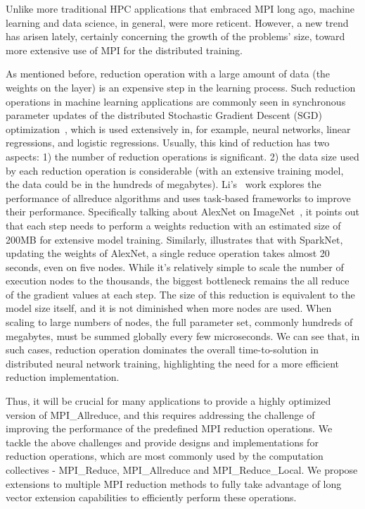 \documentclass[5p,times,twocolumn]{elsarticle}
\newcommand{\mpi}[0]{\textsc{MPI}\xspace}
\newcommand{\sve}[0]{\textsc{SVE}\xspace}
\begin{document}

Unlike more traditional HPC applications that embraced MPI long ago,
machine learning and data science, in general, were more reticent. However,
a new trend has arisen lately, certainly concerning the growth
of the problems' size, toward more extensive use of \mpi for the distributed training.

As mentioned before, reduction operation with a large amount of
data (the weights on the layer) is an expensive step in the
learning process.
Such reduction operations in machine learning applications
are commonly seen in synchronous parameter updates of the distributed Stochastic
Gradient Descent (SGD) optimization~\cite{sgd10}, which is used extensively
in, for example, neural networks, linear regressions, and logistic
regressions. Usually, this kind of reduction has two aspects: 1) the number of reduction
operations is significant. 2) the data size used by each reduction operation is considerable (with an extensive training model, the data could be in the hundreds of megabytes).
%
Li's~\cite{inproceedings} work explores the performance of allreduce algorithms
and uses task-based frameworks to improve their performance. Specifically talking about AlexNet on ImageNet~\cite{NIPS20124824}, it points out that
each step needs to perform a weights reduction with an estimated size
of 200MB for extensive model training.
%
Similarly, \cite{moritz2015sparknet}
illustrates that with SparkNet, updating the weights of AlexNet, a single reduce
operation takes almost 20 seconds, even on five nodes. While it's relatively simple to scale
the number of execution nodes to the thousands, the biggest bottleneck remains the all reduce of
the gradient values at each step. The size of this reduction is equivalent
to the model size itself, and it is not diminished when more
nodes are used. When scaling to large numbers of nodes, the full parameter set, commonly hundreds of
megabytes, must be summed globally every few microseconds. We can see that, in such cases,
reduction operation dominates the overall time-to-solution in distributed neural network
training, highlighting the need for a more efficient reduction implementation.

Thus, it will be crucial for many applications to provide a highly optimized
version of MPI\_Allreduce, and this requires addressing the challenge of improving the performance of the predefined MPI reduction operations. We tackle the above challenges and provide designs and implementations
for reduction operations, which are most commonly used by the computation
collectives - MPI\_Reduce, MPI\_Allreduce and MPI\_Reduce\_Local.
We propose extensions to multiple \mpi reduction methods to fully take
advantage of long vector extension capabilities to efficiently
perform these operations.
\end{document}

